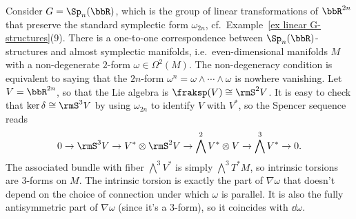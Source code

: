 \begin{example}\label{ex almost symplectic structures}
    Consider $G=\Sp_n(\bbR)$, which is the group of linear transformations of $\bbR^{2n}$ that preserve the standard symplectic form $\omega_{2n}$, cf.\ Example~\ref{ex linear G-structures}(9). There is a one-to-one correspondence between $\Sp_n(\bbR)$-structures and almost symplectic manifolds, i.e.\ even-dimensional manifolds $M$ with a non-degenerate $2$-form $\omega\in \Omega^2(M)$. The non-degeneracy condition is equivalent to saying that the $2n$-form $\omega^n=\omega\wedge\cdots\wedge\omega$ is nowhere vanishing.
    Let $V=\bbR^{2n}$, so that the Lie algebra is $\fraksp(V)\cong \rmS^2 V$. It is easy to check that $\ker\delta\cong \rmS^3 V$ by using $\omega_{2n}$ to identify $V$ with $V^\ast$, so the Spencer sequence reads 
    \[0\to \rmS^3 V\to V^\ast \otimes \rmS^2V\to \bigwedge^2 V^\ast\otimes V\to \bigwedge^3 V^\ast\to 0.\]
    The associated bundle with fiber $\bigwedge^3 V^\ast$ is simply $\bigwedge^3 T^\ast M$, so intrinsic torsions are $3$-forms on $M$. The intrinsic torsion is exactly the part of $\nabla\omega$ that doesn't depend on the choice of connection under which $\omega$ is parallel. It is also the fully antisymmetric part of $\nabla\omega$ (since it's a $3$-form), so it coincides with $\dd\omega$.


\end{example}
